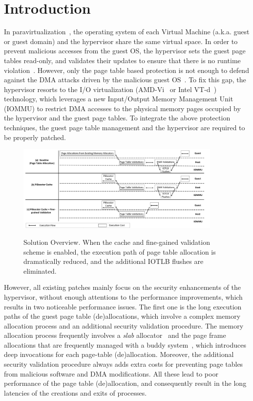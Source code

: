 \section{Introduction} \label{sec:intro}
In paravirtualization~\cite{XEN-SOSP03,whitaker2002scale}, the operating system of each Virtual Machine (a.k.a. guest or guest domain) and the hypervisor share the same virtual space.
In order to prevent malicious accesses from the guest OS, the hypervisor sets the guest page tables read-only, and validates their updates to ensure that there is no runtime violation~\cite{XEN-SOSP03}.
However, only the page table based protection is not enough to defend against the DMA attacks driven by the malicious guest OS~\cite{disaggregation}.
To fix this gap, the hypervisor resorts to the I/O virtualization (AMD-Vi~\cite{amdvt} or Intel VT-d~\cite{intelvt}) technology, which leverages a new Input/Output Memory Management Unit (IOMMU) to restrict DMA accesses to the physical memory pages occupied by the hypervisor and the guest page tables.
To integrate the above protection techniques, the guest page table management and the hypervisor are required to be properly patched.

\begin{figure}[ht]
\centering
\includegraphics[width=0.9\textwidth]{image/overview/overview.pdf} \\
\caption{Solution Overview. When the \name cache and fine-gained validation scheme is enabled,
the execution path of page table allocation is dramatically reduced, and the additional IOTLB flushes are eliminated.}
\label{fig:overview}
\end{figure}

However, all existing patches mainly focus on the security enhancements of the hypervisor, without enough attentions to the performance improvements, which results in two noticeable performance issues.
The first one is the long execution paths of the guest page table (de)allocations, which involve a complex memory allocation process and an additional security validation procedure.
The memory allocation process frequently involves a \emph{slab} allocator~\cite{slaballocator} and the page frame allocations that are frequently managed with a buddy system~\cite{buddyallocator}, which introduces deep invocations for each page-table (de)allocation.
Moreover, the additional security validation procedure always adds extra costs for preventing page tables from malicious software and DMA modifications.
All these lead to poor performance of the page table (de)allocation, and consequently result in the long latencies of the creations and exits of processes.

